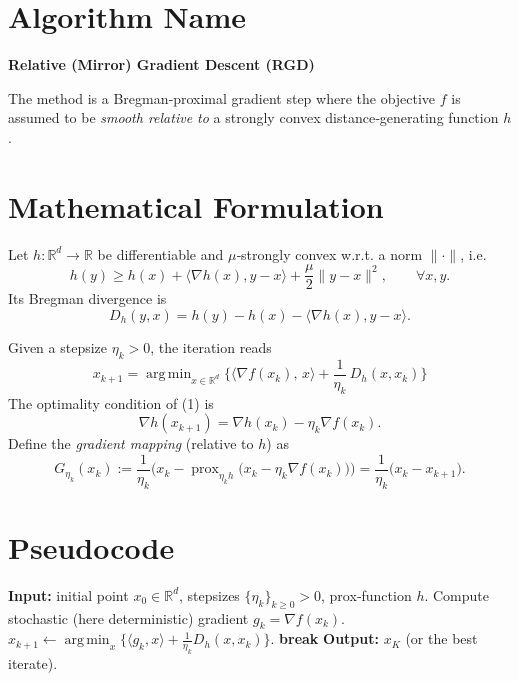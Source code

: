 \documentclass{article}
\newcommand{\argmin}{\mathop{\mathrm{arg\,min}}}
\newcommand{\grad}{\nabla}
\newcommand{\Breg}{D_{h}}
\newcommand{\prox}{\operatorname{prox}}
\begin{document}
\section*{Algorithm Name}
\textbf{Relative (Mirror) Gradient Descent (RGD)}  

The method is a Bregman‑proximal gradient step where the objective $f$ is assumed to be \emph{smooth relative to} a strongly convex distance‑generating function $h$.

\section*{Mathematical Formulation}
Let $h:\mathbb R^{d}\to\mathbb R$ be differentiable and $\mu$‑strongly convex w.r.t. a norm $\|\cdot\|$, i.e.  
\[
h(y)\ge h(x)+\langle \grad h(x),y-x\rangle+\frac{\mu}{2}\|y-x\|^{2},
\qquad\forall x,y.
\]
Its Bregman divergence is  
\[
\Breg (y,x)=h(y)-h(x)-\langle \grad h(x),y-x\rangle .
\]

Given a stepsize $\eta_k>0$, the iteration reads
\begin{equation}
\boxed{
x_{k+1}= \argmin_{x\in\mathbb R^{d}}
\Big\{ \langle \grad f(x_k),\,x\rangle+\frac{1}{\eta_k}\,\Breg (x,x_k) \Big\}
}\tag{1}
\end{equation}
The optimality condition of (1) is
\begin{equation}
\grad h(x_{k+1}) = \grad h(x_k)-\eta_k \grad f(x_k). \tag{2}
\end{equation}
Define the \emph{gradient mapping} (relative to $h$) as
\begin{equation}
G_{\eta_k}(x_k):=\frac{1}{\eta_k}\bigl(x_k-\prox_{\eta_k h}\bigl(x_k-\eta_k\grad f(x_k)\bigr)\bigr)
               =\frac{1}{\eta_k}\bigl(x_k-x_{k+1}\bigr). \tag{3}
\end{equation}

\section*{Pseudocode}
\begin{algorithm}[H]
\caption{Relative Gradient Descent (RGD)}\label{alg:RGD}
\begin{algorithmic}[1]
\STATE \textbf{Input:} initial point $x_0\in\mathbb R^{d}$, stepsizes $\{\eta_k\}_{k\ge0}>0$, prox‑function $h$.
\STATE Compute stochastic (here deterministic) gradient $g_k=\grad f(x_k)$.
\STATE $x_{k+1}\gets\argmin_{x}\Big\{\langle g_k,x\rangle+\frac{1}{\eta_k}\Breg(x,x_k)\Big\}$.
\STATE \textbf{break}
\ENDIF
\ENDFOR
\STATE \textbf{Output:} $x_{K}$ (or the best iterate).
\end{algorithmic}
\end{algorithm}
\end{document}
